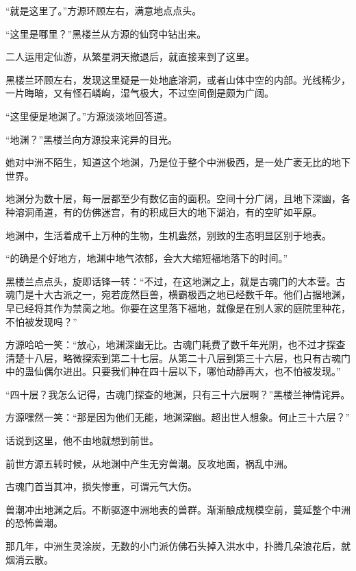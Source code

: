 
\begin{this_body}

“就是这里了。”方源环顾左右，满意地点点头。

“这里是哪里？”黑楼兰从方源的仙窍中钻出来。

二人运用定仙游，从繁星洞天撤退后，就直接来到了这里。

黑楼兰环顾左右，发现这里疑是一处地底溶洞，或者山体中空的内部。光线稀少，一片晦暗，又有怪石嶙峋，湿气极大，不过空间倒是颇为广阔。

“这里便是地渊了。”方源淡淡地回答道。

“地渊？”黑楼兰向方源投来诧异的目光。

她对中洲不陌生，知道这个地渊，乃是位于整个中洲极西，是一处广袤无比的地下世界。

地渊分为数十层，每一层都至少有数亿亩的面积。空间十分广阔，且地下深幽，各种溶洞甬道，有的仿佛迷宫，有的积成巨大的地下湖泊，有的空旷如平原。

地渊中，生活着成千上万种的生物，生机盎然，别致的生态明显区别于地表。

“的确是个好地方，地渊中地气浓郁，会大大缩短福地落下的时间。”

黑楼兰点点头，旋即话锋一转：“不过，在这地渊之上，就是古魂门的大本营。古魂门是十大古派之一，宛若庞然巨兽，横霸极西之地已经数千年。他们占据地渊，早已经将其作为禁脔之地。你要在这里落下福地，就像是在别人家的庭院里种花，不怕被发现吗？”

方源哈哈一笑：“放心，地渊深幽无比。古魂门耗费了数千年光阴，也不过才探查清楚十八层，略微探索到第二十七层。从第二十八层到第三十六层，也只有古魂门中的蛊仙偶尔进出。只要我们种在四十层以下，哪怕动静再大，也不怕被发现。”

“四十层？我怎么记得，古魂门探查的地渊，只有三十六层啊？”黑楼兰神情诧异。

方源嘿然一笑：“那是因为他们无能，地渊深幽。超出世人想象。何止三十六层？”

话说到这里，他不由地就想到前世。

前世方源五转时候，从地渊中产生无穷兽潮。反攻地面，祸乱中洲。

古魂门首当其冲，损失惨重，可谓元气大伤。

兽潮冲出地渊之后。不断驱逐中洲地表的兽群。渐渐酿成规模空前，蔓延整个中洲的恐怖兽潮。

那几年，中洲生灵涂炭，无数的小门派仿佛石头掉入洪水中，扑腾几朵浪花后，就烟消云散。


\end{this_body}
